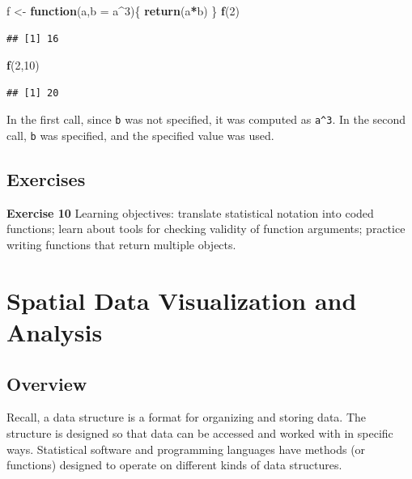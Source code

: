 \documentclass[
]{krantz}
\newenvironment{Shaded}{\begin{snugshade}}{\end{snugshade}}
\newcommand{\ControlFlowTok}[1]{\textcolor[rgb]{0.13,0.29,0.53}{\textbf{#1}}}
\newcommand{\DataTypeTok}[1]{\textcolor[rgb]{0.13,0.29,0.53}{#1}}
\newcommand{\DecValTok}[1]{\textcolor[rgb]{0.00,0.00,0.81}{#1}}
\newcommand{\KeywordTok}[1]{\textcolor[rgb]{0.13,0.29,0.53}{\textbf{#1}}}
\newcommand{\NormalTok}[1]{#1}
\newcommand{\OperatorTok}[1]{\textcolor[rgb]{0.81,0.36,0.00}{\textbf{#1}}}
\newcommand{\StringTok}[1]{\textcolor[rgb]{0.31,0.60,0.02}{#1}}
\begin{document}
\begin{Shaded}
\begin{Highlighting}[]
\NormalTok{f \textless{}{-}}\StringTok{ }\ControlFlowTok{function}\NormalTok{(a,}\DataTypeTok{b =}\NormalTok{ a}\OperatorTok{\^{}}\DecValTok{3}\NormalTok{)\{}
    \KeywordTok{return}\NormalTok{(a}\OperatorTok{*}\NormalTok{b)}
\NormalTok{\}}
\KeywordTok{f}\NormalTok{(}\DecValTok{2}\NormalTok{)}
\end{Highlighting}
\end{Shaded}

\begin{verbatim}
## [1] 16
\end{verbatim}

\begin{Shaded}
\begin{Highlighting}[]
\KeywordTok{f}\NormalTok{(}\DecValTok{2}\NormalTok{,}\DecValTok{10}\NormalTok{)}
\end{Highlighting}
\end{Shaded}

\begin{verbatim}
## [1] 20
\end{verbatim}

In the first call, since \texttt{b} was not specified, it was computed as \texttt{a\^{}3}. In the second call, \texttt{b} was specified, and the specified value was used.

\hypertarget{ch7Ex}{%
\section{Exercises}\label{ch7Ex}}

\textbf{Exercise 10} Learning objectives: translate statistical notation into coded functions; learn about tools for checking validity of function arguments; practice writing functions that return multiple objects.

\hypertarget{sp}{%
\chapter{Spatial Data Visualization and Analysis}\label{sp}}

\hypertarget{overview}{%
\section{Overview}\label{overview}}

Recall, a data structure is a format for organizing and storing data. The structure is designed so that data can be accessed and worked with in specific ways. Statistical software and programming languages have methods (or functions) designed to operate on different kinds of data structures.
\end{document}
